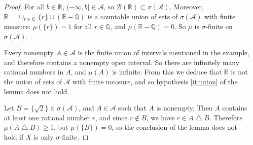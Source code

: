 \documentclass[11pt,a4paper,twoside]{article}
\theoremstyle{definition}
\theoremstyle{plain}
\begin{document}
\begin{proof}

  For all $b \in \mathbb{R}$, $( -\infty, b ] \in \mathscr{A}$, so $\mathscr{B} ( \mathbb{R} ) \subset \sigma ( \mathscr{A} )$.
  Moreover, $\mathbb{R} = \cup_{r \in \mathbb{Q}} \,\{ r \} \cup ( \mathbb{R} - \mathbb{Q} )$ is a countable union of sets of $\sigma ( \mathscr{A} )$
  with finite measure: $\mu ( \{ r \} ) = 1$ for all $r \in \mathbb{Q}$, and $\mu ( \mathbb{R} - \mathbb{Q} ) = 0$. So $\mu$
  is $\sigma$-finite on $\sigma ( \mathscr{A} )$.

  Every nonempty $A \in \mathscr{A}$ is the finite union of intervals mentioned in the example, and therefore contains
  a nonempty open interval. So there are infinitely many rational numbers in $A$, and $\mu ( A )$ is infinite.
  From this we deduce that $\mathbb{R}$ is not the union of sets of $\mathscr{A}$ with finite measure, and so
  hypothesis \ref{it:union} of the lemma does not hold.

  Let $B = \{ \sqrt{2} \} \in \sigma ( \mathscr{A} )$, and $A \in \mathscr{A}$ such that $A$ is nonempty.
  Then $A$ contains at least one rational number $r$, and since $r \notin B$, we have $r \in A \bigtriangleup B$.
  Therefore $\mu ( A \bigtriangleup B ) \geq 1$, but $\mu ( \{ B \} ) = 0$, so the conclusion of the lemma does not hold
  if $X$ is only $\sigma$-finite.

\end{proof}
\end{document}
